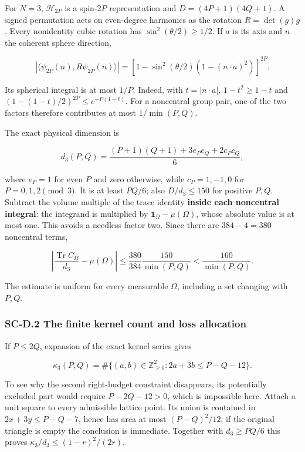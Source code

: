 For \(N=3\), \(\mathcal H_{2P}\) is a spin-\(2P\) representation and \(D=(4P+1)(4Q+1)\). A signed permutation acts on even-degree harmonics as the rotation \(R=\det(g)g\). Every nonidentity cubic rotation has \(\sin^2(\theta/2)\geq1/2\). If \(a\) is its axis and \(n\) the coherent sphere direction,

\[
|\langle\psi_{2P}(n),R\psi_{2P}(n)\rangle|
=\left[1-\sin^2(\theta/2)(1-(n\cdot a)^2)\right]^{2P}.
\]

Its spherical integral is at most \(1/P\). Indeed, with \(t=|n\cdot a|\), \(1-t^2\geq1-t\) and \((1-(1-t)/2)^{2P}\leq e^{-P(1-t)}\). For a noncentral group pair, one of the two factors therefore contributes at most \(1/\min(P,Q)\).

The exact physical dimension is

\[
d_3(P,Q)=\frac{(P+1)(Q+1)+3e_Pe_Q+2c_Pc_Q}{6},
\]

where \(e_P=1\) for even \(P\) and zero otherwise, while \(c_P=1,-1,0\) for \(P=0,1,2\pmod3\). It is at least \(PQ/6\); also \(D/d_3\leq150\) for positive \(P,Q\). Subtract the volume multiple of the trace identity \textbf{inside each noncentral integral}: the integrand is multiplied by \(\mathbf1_\Omega-\mu(\Omega)\), whose absolute value is at most one. This avoids a needless factor two. Since there are \(384-4=380\) noncentral terms,

\[
\left|\frac{\operatorname{Tr}C_\Omega}{d_3}-\mu(\Omega)\right|
\leq\frac{380}{384}\frac{150}{\min(P,Q)}
<\frac{160}{\min(P,Q)}.
\]

The estimate is uniform for every measurable \(\Omega\), including a set changing with \(P,Q\).

\hypertarget{sc-d.2-the-finite-kernel-count-and-loss-allocation}{%
\subsubsection{SC-D.2 The finite kernel count and loss allocation}\label{sc-d.2-the-finite-kernel-count-and-loss-allocation}}

If \(P\leq2Q\), expansion of the exact kernel series gives

\[
\kappa_3(P,Q)=\#\{(a,b)\in\mathbb Z_{\geq0}^2:
2a+3b\leq P-Q-12\}.
\]

To see why the second right-budget constraint disappears, its potentially excluded part would require \(P-2Q-12>0\), which is impossible here. Attach a unit square to every admissible lattice point. Its union is contained in \(2x+3y\leq P-Q-7\), hence has area at most \((P-Q)^2/12\); if the original triangle is empty the conclusion is immediate. Together with \(d_3\geq PQ/6\) this proves \(\kappa_3/d_3\leq(1-r)^2/(2r)\).

